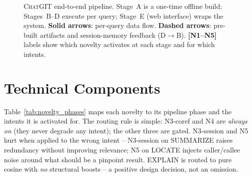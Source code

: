 \documentclass[runningheads]{llncs}
\newcommand{\chatgit}{\textsc{ChatGIT}\xspace}
\begin{document}
\begin{figure}[H]
{%
}
\caption{\chatgit end-to-end pipeline. Stage~A is a one-time offline build;
Stages~B--D execute per query; Stage~E (web interface) wraps the system.
\textbf{Solid arrows}: per-query data flow. \textbf{Dashed arrows}: pre-built
artifacts and session-memory feedback (D$\to$B). \textbf{[N1--N5]} labels
show which novelty activates at each stage and for which intents.}
\label{fig:pipeline}
\end{figure}

\section{Technical Components}
\label{sec:components}

Table~\ref{tab:novelty_phases} maps each novelty to its pipeline phase and
the intents it is activated for. The routing rule is simple: N3-coref and N4
are \emph{always on} (they never degrade any intent); the other three are
gated. N3-session and N5 hurt when applied to the wrong intent -- N3-session
on SUMMARIZE raises redundancy without improving relevance; N5 on LOCATE
injects caller/callee noise around what should be a pinpoint result. EXPLAIN
is routed to pure cosine with \emph{no} structural boosts -- a positive
design decision, not an omission.
\end{document}
